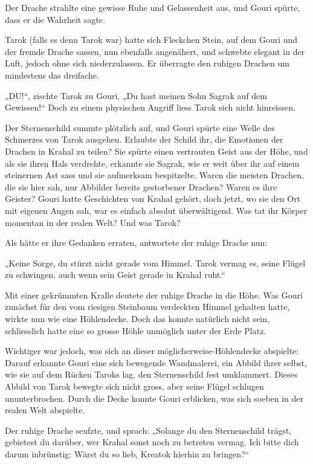 \documentclass[10pt, a4paper, oneside]{book}
\begin{document}
Der Drache strahlte eine gewisse Ruhe und Gelassenheit aus, und Gouri spürte, dass er die Wahrheit sagte.

Tarok (falls es denn Tarok war) hatte sich Fleckchen Stein, auf dem Gouri und der fremde Drache sassen, nun ebenfalls angenähert, und schwebte elegant in der Luft, jedoch ohne sich niederzulassen. Er überragte den ruhigen Drachen um mindestens das dreifache.

„DU!“, zischte Tarok zu Gouri, „Du hast meinen Sohn Sagrak auf dem Gewissen!“ Doch zu einem physischen Angriff liess Tarok sich nicht hinreissen.

Der Sternenschild summte plötzlich auf, und Gouri spürte eine Welle des Schmerzes von Tarok ausgehen. Erlaubte der Schild ihr, die Emotionen der Drachen in Krahal zu teilen? Sie spürte einen vertrauten Geist aus der Höhe, und als sie ihren Hals verdrehte, erkannte sie Sagrak, wie er weit über ihr auf einem steinernen Ast sass und sie aufmerksam bespitzelte. Waren die meisten Drachen, die sie hier sah, nur Abbilder bereits gestorbener Drachen? Waren es ihre Geister? Gouri hatte Geschichten von Krahal gehört, doch jetzt, wo sie den Ort mit eigenen Augen sah, war es einfach absolut überwältigend. Was tat ihr Körper momentan in der realen Welt? Und was Tarok?

Als hätte er ihre Gedanken erraten, antwortete der ruhige Drache nun:

„Keine Sorge, du stürzt nicht gerade vom Himmel. Tarok vermag es, seine Flügel zu schwingen, auch wenn sein Geist gerade in Krahal ruht.“

Mit einer gekrümmten Kralle deutete der ruhige Drache in die Höhe. Was Gouri zunächst für den vom riesigen Steinbaum verdeckten Himmel gehalten hatte, wirkte nun wie eine Höhlendecke. Doch das konnte natürlich nicht sein, schliesslich hatte eine so grosse Höhle unmöglich unter der Erde Platz.

Wichtiger war jedoch, was sich an dieser möglicherweise-Höhlendecke abspielte: Darauf erkannte Gouri eine sich bewegende Wandmalerei, ein Abbild ihrer selbst, wie sie auf dem Rücken Taroks lag, den Sternenschild fest umklammert. Dieses Abbild von Tarok bewegte sich nicht gross, aber seine Flügel schlugen ununterbrochen. Durch die Decke konnte Gouri erblicken, was sich soeben in der realen Welt abspielte.

Der ruhige Drache seufzte, und sprach: „Solange du den Sternenschild trägst, gebietest du darüber, wer Krahal sonst noch zu betreten vermag. Ich bitte dich darum inbrünstig: Wärst du so lieb, Kreatok hierhin zu bringen?“
\end{document}
